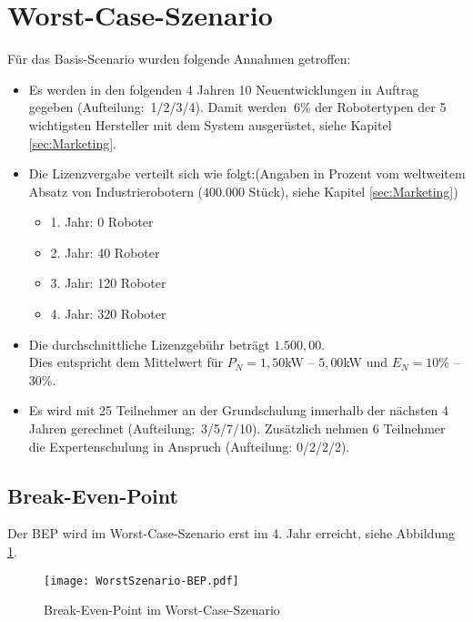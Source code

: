 \section{Worst-Case-Szenario}
Für das Basis-Scenario wurden folgende Annahmen getroffen:
\begin{itemize}
	\item Es werden in den folgenden 4 Jahren 10 Neuentwicklungen in Auftrag gegeben (Aufteilung:~1/2/3/4). Damit werden $~6$\% der Robotertypen der 5 wichtigsten Hersteller mit dem System ausgerüstet, siehe Kapitel \ref{sec:Marketing}.
	\item Die Lizenzvergabe verteilt sich wie folgt:\newline (Angaben in Prozent vom weltweitem Absatz von Industrierobotern ($400.000$ Stück), siehe Kapitel \ref{sec:Marketing})
	\begin{itemize}
		\item 1. Jahr: 0 Roboter
		\item 2. Jahr: 40 Roboter
		\item 3. Jahr: 120 Roboter
		\item 4. Jahr: 320 Roboter
	\end{itemize}
	\item Die durchschnittliche Lizenzgebühr beträgt $1.500,00$\officialeuro.\\ Dies entspricht dem Mittelwert für $P_N = 1,50$kW -- $5,00$kW und $E_N = 10$\% -- $30$\%.
	\item Es wird mit 25 Teilnehmer an der Grundschulung innerhalb der nächsten 4 Jahren gerechnet (Aufteilung:~3/5/7/10). Zusätzlich nehmen 6 Teilnehmer die Expertenschulung in Anspruch (Aufteilung: 0/2/2/2).
\end{itemize}

\subsection{Break-Even-Point}
Der BEP wird im Worst-Case-Szenario erst im 4. Jahr erreicht, siehe Abbildung \ref{fig:WorstSzenario-BEP}.
\begin{figure}[h]
	\centering
	\texttt{[image: WorstSzenario-BEP.pdf]}
	\caption{Break-Even-Point im Worst-Case-Szenario}
	\label{fig:WorstSzenario-BEP}
\end{figure}

